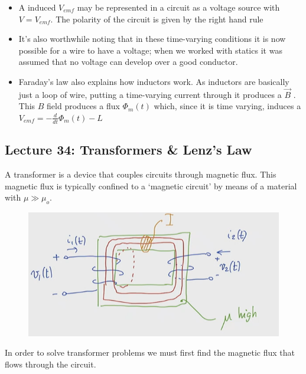 \documentclass[10pt]{article}
\begin{document}
\begin{itemize}
	\item A induced $ V_{emf}$  may be represented in a circuit as a voltage source with $ V = V_{emf} $. The polarity of the circuit is given by the right hand rule 
	\item It's also worthwhile noting that in these time-varying conditions it is now possible for a wire to have a voltage; when we worked with statics it was assumed that no voltage can develop over a good conductor.
	\item Faraday's law also explains how inductors work. As inductors are basically just a loop of wire, putting a time-varying current through it produces a $ \vec{B}$ . This $ B $ field produces a flux $ \Phi_m(t) $ which, since it is time varying, induces a $ V_{emf} = -\frac{d}{dt} \Phi_m(t) -L $ 
\end{itemize}


\subsection{Lecture 34: Transformers \& Lenz's Law}


A transformer is a device that couples circuits through magnetic flux.
This magnetic flux is typically confined to a `magnetic circuit' by means of a material with $ \mu \gg \mu_o $.

\begin{figure}[H]
	\centering
	\includegraphics[width=0.8\linewidth]{img/image_2022-04-18-17-05-08.png}
\end{figure}

In order to solve transformer problems we must first find the magnetic flux that flows through the circuit.
\end{document}
